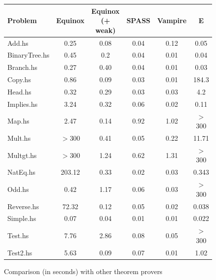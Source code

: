 \documentclass[preprint]{sigplanconf}
\begin{document}
\begin{figure}
\label{comparison}
\begin{center}
    \begin{tabular}{l|c|c|c|c|c}
      Problem & Equinox & Equinox (+ weak) & SPASS & Vampire & E \\
      \hline
      Add.hs & 0.25 & 0.08 & 0.04 & 0.12 & 0.05\\
      BinaryTree.hs & 0.45 & 0.2 & 0.04 & 0.01 & 0.04 \\
      Branch.hs & 0.27 & 0.40 & 0.04 & 0.01 & 0.03 \\
      Copy.hs & 0.86 & 0.09 & 0.03 & 0.01 & 184.3 \\
      Head.hs & 0.32 & 0.29 & 0.03 & 0.03 & 4.2 \\
      Implies.hs & 3.24 & 0.32 & 0.06 & 0.02 & 0.11 \\
      Map.hs & 2.47 & 0.14 & 0.92 & 1.02 & $>$300 \\
      Mult.hs & $>$300 & 0.41 & 0.05 & 0.22 & 11.71 \\
      Multgt.hs & $>$300 & 1.24 & 0.62 & 1.31 & $>$300 \\
      NatEq.hs & 203.12 & 0.33 & 0.02 & 0.03 & 0.343 \\
      Odd.hs & 0.42 & 1.17 & 0.06 & 0.03 & $>$300 \\
      Reverse.hs & 72.32 & 0.12 & 0.05 & 0.02 & 0.038 \\
      Simple.hs & 0.07 & 0.04 & 0.01 & 0.01 & 0.022 \\
      Test.hs & 7.76 & 2.86 & 0.08 & 0.05 & $>$300 \\
      Test2.hs & 5.63 & 0.09 & 0.07 & 0.01 & 1.02 \\
    \end{tabular}
\end{center}
\caption{Comparison (in seconds) with other theorem provers}
\end{figure}
\end{document}
